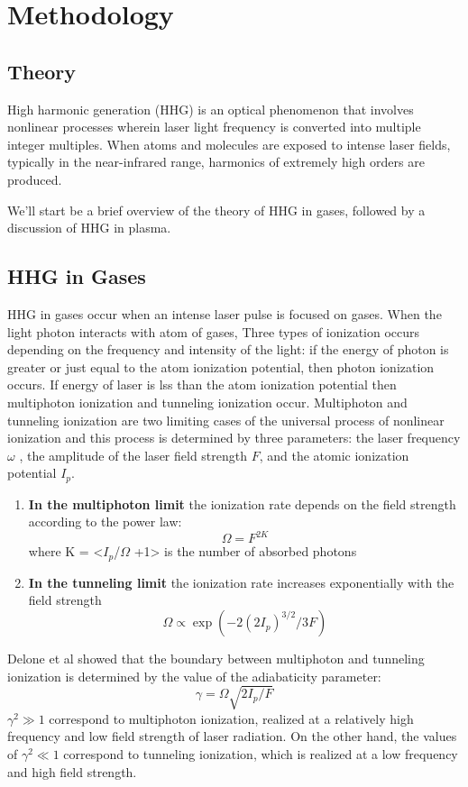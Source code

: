 \documentclass[12pt]{article}
\begin{document}
\section{Methodology}
\subsection{Theory}
High harmonic generation (HHG) is an optical phenomenon that involves nonlinear processes wherein laser light frequency is converted into multiple integer multiples. When atoms and molecules are exposed to intense laser fields, typically in the near-infrared range, harmonics of extremely high orders are produced.\cite{hhg-book}

We'll start be a brief overview of the theory of HHG in gases, followed by a discussion of HHG in plasma.

\subsection{HHG in Gases}
HHG in gases occur when an intense laser pulse is focused on gases. When the light photon interacts with atom of gases, Three types of ionization occurs depending on the frequency and intensity of the light: if the energy of photon is greater or just equal to the atom ionization potential, then photon ionization occurs. If energy of laser is lss than the atom ionization potential then multiphoton ionization and tunneling ionization occur. Multiphoton and tunneling ionization are two limiting cases of the universal process of nonlinear ionization and this process is determined by three parameters: the laser frequency \(\omega\) , the amplitude of the laser field strength $F$, and the atomic ionization potential \(I_p\).

\begin{enumerate}
    \def\labelenumi{\arabic{enumi}.}
    \item \textbf{In the multiphoton limit} the ionization rate depends on the field strength according to the power law: \[\Omega = F^{2K}\] where K = \textless{}\(I_p\)/\(\Omega\) +1\textgreater{} is the number of absorbed photons
    \item \textbf{In the tunneling limit} the ionization rate increases exponentially with the field strength \[\Omega \propto  \exp(-2(2I_p)^{3/2}/3F)\]
\end{enumerate}

Delone et al \cite{gas-second} showed that the boundary between multiphoton and tunneling ionization is determined by the value of the adiabaticity parameter:
\begin{equation}
    \label{eq:adiabatic}
    \gamma =\Omega \sqrt{2I_p/F}
\end{equation}
\noindent
$\gamma^2 \gg 1$ correspond to multiphoton ionization, realized at a relatively high frequency and low field strength of laser radiation. On the other hand, the values of $\gamma^2 \ll 1$  correspond to tunneling ionization, which is realized at a low frequency and high field strength.
\end{document}
